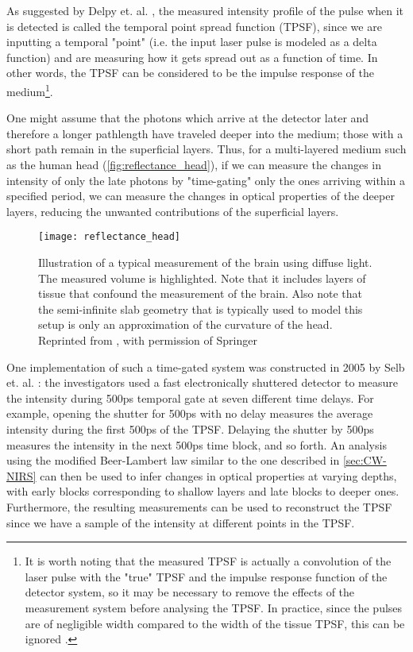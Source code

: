 As suggested by Delpy et. al. \cite{Delpy1988}, the measured intensity profile of the pulse when it is detected is called the temporal point spread function (TPSF), since we are inputting a temporal "point" (i.e. the input laser pulse is modeled as a delta function) and are measuring how it gets spread out as a function of time. In other words, the TPSF can be considered to be the impulse response of the medium\footnote{It is worth noting that the measured TPSF is actually a convolution of the laser pulse with the "true" TPSF and the impulse response function of the detector system, so it may be necessary to remove the effects of the measurement system before analysing the TPSF. In practice, since the pulses are of negligible width compared to the width of the tissue TPSF, this can be ignored \cite[ch. 20.4.1]{Handbook}.}.

One might assume that the photons which arrive at the detector later and therefore a longer pathlength have traveled deeper into the medium; those with a short path remain in the superficial layers. Thus, for a multi-layered medium such as the human head (\autoref{fig:reflectance_head}), if we can measure the changes in intensity of only the late photons by "time-gating" only the ones arriving within a specified period, we can measure the changes in optical properties of the deeper layers, reducing the unwanted contributions of the superficial layers. 

\begin{figure}[tb]
    \centering
    \texttt{[image: reflectance\_head]}
    \caption{Illustration of a typical measurement of the brain using diffuse light. The measured volume is highlighted. Note that it includes layers of tissue that confound the measurement of the brain. Also note that the semi-infinite slab geometry that is typically used to model this setup is only an approximation of the curvature of the head. Reprinted from \cite[ch. 3]{Madsen2013}, with permission of Springer} %
    \label{fig:reflectance_head}
\end{figure}

One implementation of such a time-gated system was constructed in 2005 by Selb et. al. \cite{Selb2005}: the investigators used a fast electronically shuttered detector to measure the intensity during 500ps temporal gate at seven different time delays. For example, opening the shutter for 500ps with no delay measures the average intensity during the first 500ps of the TPSF. Delaying the shutter by 500ps measures the intensity in the next 500ps time block, and so forth. An analysis using the modified Beer-Lambert law similar to the one described in \autoref{sec:CW-NIRS} can then be used to infer changes in optical properties at varying depths, with early blocks corresponding to shallow layers and late blocks to deeper ones. Furthermore, the resulting measurements can be used to reconstruct the TPSF since we have a sample of the intensity at different points in the TPSF.

